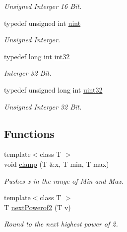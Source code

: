 \begin{DoxyCompactItemize}
\begin{DoxyCompactList}\small\item\em Unsigned Interger 16 Bit. \item\end{DoxyCompactList}\item 
\hypertarget{namespace_f2_c_a58be2bac9eb3e3c99cb41b6008bf4fae}{
typedef unsigned int \hyperlink{namespace_f2_c_a58be2bac9eb3e3c99cb41b6008bf4fae}{uint}}
\label{namespace_f2_c_a58be2bac9eb3e3c99cb41b6008bf4fae}

\begin{DoxyCompactList}\small\item\em Unsigned Interger. \item\end{DoxyCompactList}\item 
\hypertarget{namespace_f2_c_ae125264248542a3a358accdbfd2ec622}{
typedef long int \hyperlink{namespace_f2_c_ae125264248542a3a358accdbfd2ec622}{int32}}
\label{namespace_f2_c_ae125264248542a3a358accdbfd2ec622}

\begin{DoxyCompactList}\small\item\em Interger 32 Bit. \item\end{DoxyCompactList}\item 
\hypertarget{namespace_f2_c_ae9a1fcf27e85dd8fb51e9a30db5ad871}{
typedef unsigned long int \hyperlink{namespace_f2_c_ae9a1fcf27e85dd8fb51e9a30db5ad871}{uint32}}
\label{namespace_f2_c_ae9a1fcf27e85dd8fb51e9a30db5ad871}

\begin{DoxyCompactList}\small\item\em Unsigned Interger 32 Bit. \item\end{DoxyCompactList}\end{DoxyCompactItemize}
\subsection*{Functions}
\begin{DoxyCompactItemize}
\item 
{\footnotesize template$<$class T $>$ }\\void \hyperlink{namespace_f2_c_a9255a9f561e2a53a172170c17daebccd}{clamp} (T \&x, T min, T max)
\begin{DoxyCompactList}\small\item\em Pushes x in the range of Min and Max. \item\end{DoxyCompactList}\item 
{\footnotesize template$<$class T $>$ }\\T \hyperlink{namespace_f2_c_a60c6d5786600a7d7bfb8c4bfafa55419}{nextPowerof2} (T v)
\begin{DoxyCompactList}\small\item\em Round to the next highest power of 2. \item\end{DoxyCompactList}\end{DoxyCompactItemize}



